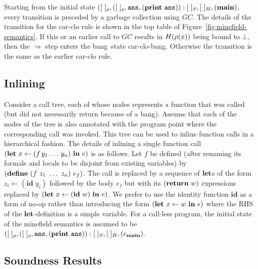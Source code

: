 \documentclass[preprint,9pt]{sigplanconf}
\newcommand{\warning}[1]{{\color{Myred}{#1}}}
\newcommand{\ID}{\mbox{$\mathbf{ id}$}}
\newcommand{\bang}{\mbox{\sc bang}}
\begin{document}
\begin{enumerate}
\begin{enumerate}
\warning{We have to tell  the reader about closure free
  paths  earlier  on.   Also,  has  $\heap[x.\alpha]$  been
  defined?}
  \end{enumerate}
Starting from the initial state $([\;]_\rho,([\;]_\rho,
\mathbf{\mbox{\tt ans}}, (\mathbf{print}~\mathbf{\mbox{\tt ans}})):[\;]_{S}  , [\;]_{H}, (\mathbf{main})$,
every transition  is preceded  by a  garbage collection
using $GC$.  The details of the transition for the {\sc
  car-clo}  rule   is  shown   in  the  top   table  of
Figure~\ref{fig:minefield-semantics}.  If  this  or  an
earlier  call to  $GC$  results  in $H(\rho(x))$  being
bound  to  $\bot$,  then  the  $\rightsquigarrow$  step
enters the  \bang\ state {\sc  car-clo-bang}. Otherwise
the transition is the same as the earlier {\sc car-clo}
rule.
\end{enumerate}

\subsection{Inlining} 

Consider a call tree, each  of whose nodes represents a
function  that  was  called (but  did  not  necessarily
return because  of a \bang).   Assume that each  of the
nodes of  the tree is  also annotated with  the program
point where  the corresponding call was  invoked.  This
tree  can  be  used  to  inline  function  calls  in  a
hierarchical fashion.  The details of inlining a single
function      call     $(\mbox{$\mathbf{ let}$}\,\,      x     \leftarrow
(f\,y_1\,\ldots\,y_n) \,\,  \mbox{$\mathbf{ in}$}\,\, e)$ is  as follows.
Let  $f$ be  defined  (after renaming  its formals  and
locals  to  be  disjoint from  existing  variables)  by
$(\DEFINE\ (f\  z_1\ \ldots\  z_n)\ e_f)$. The  call is
replaced  by   a  sequence  of  $\mbox{$\mathbf{ let}$}$s   of  the  form
$z_i\leftarrow (\ID\,\,y_i)$ followed by the body $e_f$
but with its  $(\mbox{$\mathbf{ return}$}\,\,w)$ expressions replaced by
$(\LET\,\, x  \leftarrow (\ID\,\, w) \,\,  \IN\,\, e)$.
We prefer to use the  identity function $\ID$ as a form
of no-op rather than  introducing the form $(\mbox{$\mathbf{ let}$}\,\, x
\leftarrow  w \,\,  \mbox{$\mathbf{ in}$}\,\, e)$  where the  RHS of  the
$\mbox{$\mathbf{ let}$}$-definition   is  a   simple  variable.    For  a
call-less program,  the initial state of  the minefield
semantics  is  assumed  to  be  $([\;]_\rho,([\;]_\rho,
\mathbf{\mbox{\tt ans}},      (\mathbf{print}~\mathbf{\mbox{\tt ans}})):[\;]_{S}     ,      [\;]_{H},
(e_{\mathbf{main}})$.

 
\subsection{Soundness Results}
\end{document}
